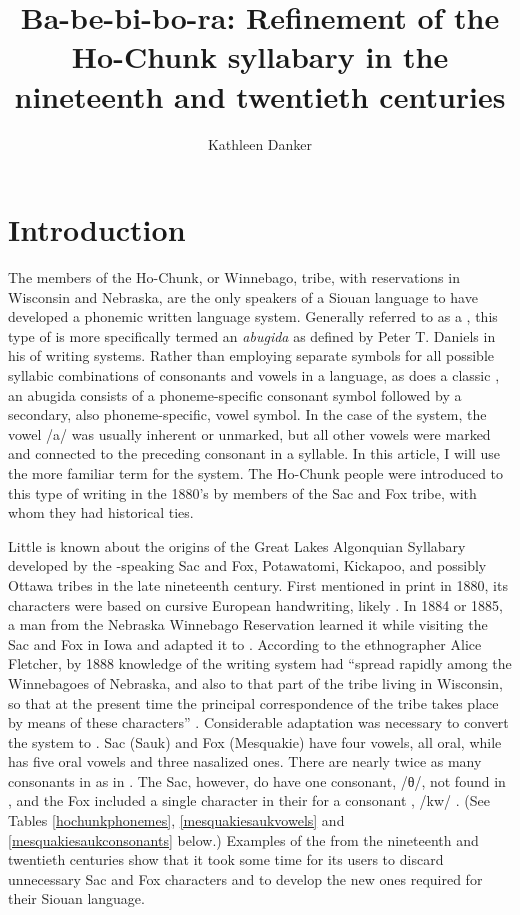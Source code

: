 \documentclass[output=paper]{LSP/langsci}
\author{Kathleen Danker}
\title{Ba-be-bi-bo-ra: {R}efinement of the {Ho-Chunk} syllabary in the nineteenth and twentieth centuries}
\begin{document}
\section{Introduction}
The members of the Ho-Chunk, or Winnebago, tribe, with reservations in Wisconsin and Nebraska, are the only speakers of a Siouan language to have developed a phonemic written language system. Generally referred to as a , this type of  is more specifically termed an \emph{abugida} as defined by Peter T. Daniels in his \citeyear{Daniels1990}  of writing systems. Rather than employing separate symbols for all possible syllabic combinations of consonants and vowels in a language, as does a classic , an abugida consists of a phoneme-specific consonant symbol followed by a secondary, also phoneme-specific, vowel symbol. In the case of the  system, the vowel /a/ was usually inherent or unmarked, but all other vowels were marked and connected to the preceding consonant in a syllable. In this article, I will use the more familiar term  for the  system. The Ho-Chunk people were introduced to this type of writing in the 1880's by members of the Sac and Fox tribe, with whom they had historical ties. 

Little is known about the origins of the Great Lakes Algonquian Syllabary developed by the -speaking Sac and Fox, Potawatomi, Kickapoo, and possibly Ottawa tribes in the late nineteenth century. First mentioned in print in 1880, its characters were based on cursive European handwriting, likely  \citep[169]{Walker1996}. In 1884 or 1885, a man from the Nebraska Winnebago Reservation learned it while visiting the Sac and Fox in Iowa and adapted it to  \citep[354]{Fletcher1890b}. According to the ethnographer Alice Fletcher, by 1888 knowledge of the  writing system had ``spread rapidly among the Winnebagoes of Nebraska, and also to that part of the tribe living in Wisconsin, so that at the present time the principal correspondence of the tribe takes place by means of these characters'' \citeyearpar[299]{Fletcher1890a}. Considerable adaptation was necessary to convert the  system to . Sac (Sauk) and Fox (Mesquakie) have four vowels, all oral, while  has five oral vowels and three nasalized ones. There are nearly twice as many consonants in  as in . The Sac, however, do have one consonant, /θ/, not found in , and the Fox included a single character in their  for a consonant , /kw/ \citep{Jones1906}. (See Tables \ref{hochunkphonemes}, \ref{mesquakiesaukvowels} and \ref{mesquakiesaukconsonants} below.) Examples of the   from the nineteenth and twentieth centuries show that it took some time for its users to discard unnecessary Sac and Fox characters and to develop the new ones required for their Siouan language. 
\end{document}
